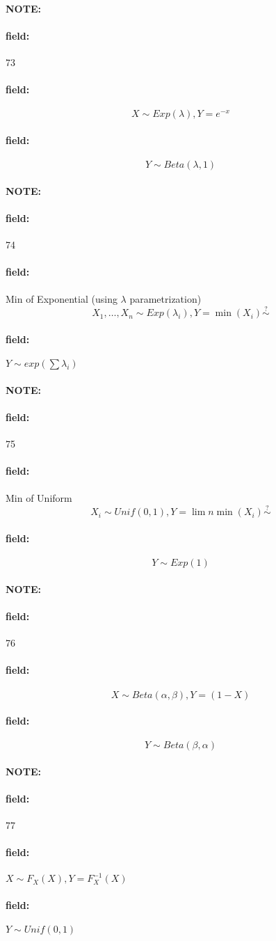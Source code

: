 \documentclass[12pt]{article}
\newenvironment{note}{\paragraph{NOTE:}}{}
\newenvironment{field}{\paragraph{field:}}{}
\begin{document}
\begin{note} \begin{field} \tiny 73 \end{field}
  \begin{field}
    $$ X \sim Exp(\lambda), Y  = e^{-x}$$
  \end{field}
  \begin{field}
    $$Y \sim Beta(\lambda,1)$$
  \end{field}
\end{note}

\begin{note} \begin{field} \tiny 74 \end{field}
  \begin{field}
    Min of Exponential (using $\lambda$ parametrization)
    $$X_1, \ldots , X_n \sim  Exp(\lambda_i), Y = \min(X_i) \overset{?}{\sim}$$
  \end{field}
  \begin{field}
    $Y \sim exp(\sum \lambda_i)$
  \end{field}
\end{note}

\begin{note} \begin{field} \tiny 75 \end{field}
  \begin{field}
    Min of Uniform
    $$ X_i \sim Unif(0,1), Y = \lim n \min(X_i) \overset{?}{\sim}$$
  \end{field}
  \begin{field}
    $$Y \sim Exp(1)$$
  \end{field}
\end{note}

\begin{note} \begin{field} \tiny 76 \end{field}
  \begin{field}
    $$ X \sim Beta(\alpha,\beta), Y = (1-X)$$
  \end{field}
  \begin{field}
    $$ Y \sim Beta(\beta,\alpha)$$
  \end{field}
\end{note}

\begin{note} \begin{field} \tiny 77 \end{field}
  \begin{field}
    $X \sim F_X(X), Y = F^{-1}_X(X)$
  \end{field}
  \begin{field}
    $Y \sim Unif(0,1)$
  \end{field}
\end{note}
\end{document}
